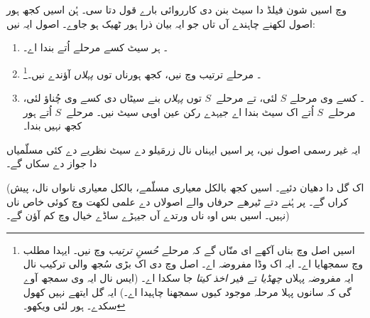 \documentclass[../../../include/open-logic-section]{subfiles}
\begin{document}

 وچ اسیں شون فیلڈ دا سیٹ بنن دی کارروائی
بارے قول دتا سی۔ ہُن اسیں کجھ ہور اصول لکھنے چاہندے آں تاں جو ایہ بیان
ذرا ہور ٹھیک ہو جاوے۔ اصول ایہ نیں:
\begin{enumerate}
\item[] \stageshier۔ ہر سیٹ کسے مرحلے اُتے بندا اے۔
\item[] \stagesord۔ مرحلے ترتیب وچ نیں، کجھ ہورناں توں \emph{پہلاں}
آؤندے نیں۔\footnote{اسیں اصل وچ بناں آکھے ای منّاں گے کہ مرحلے
\emph{حُسنِ ترتیب} وچ نیں۔ ایہدا مطلب  وچ
سمجھایا اے۔ ایہ اک وڈا مفروضہ اے۔ اصل وچ \citet{Scott1974} دی اک
بڑی سُجھ والی ترکیب نال ایہ مفروضہ پہلاں \emph{چھڈیا} تے فیر
\emph{اخذ کیتا} جا سکدا اے۔ (ایس نال ایہ وی سمجھ آوے گی کہ سانوں
پہلا مرحلہ موجود کیوں سمجھنا چاہیدا اے۔) ایہ گل ایتھے نہیں کھول سکدے۔
ہور لئی \citet{ButtonLT1} ویکھو۔}
\item[] \stagesacc۔ کسے وی مرحلے $S$ لئی، تے مرحلے~$S$ توں \emph{پہلاں} بنے سیٹاں دی کسے وی چُناؤ لئی، مرحلے~$S$ اُتے اک
سیٹ بندا اے جیہدے رکن عین اوہی سیٹ نیں۔ مرحلے~$S$ اُتے ہور کجھ نہیں بندا۔
\end{enumerate}
ایہ غیر رسمی اصول نیں، پر اسیں ایہناں نال زرمَیلو دے سیٹ نظریے دے کئی
مسلّمیاں دا جواز دے سکاں گے۔

(اک گل دا دھیان دئیے۔ اسیں کجھ بالکل معیاری مسلّمے، بالکل معیاری ناںواں
نال، پیش کراں گے۔ پر ہُنے دتے ٹیرھے حرفاں والے اصولاں دے علمی لکھت وچ
کوئی خاص ناں نہیں۔ اسیں بس اوہ ناں ورتدے آں جیہڑے ساڈے خیال وچ کم آؤن گے۔)
\end{document}
